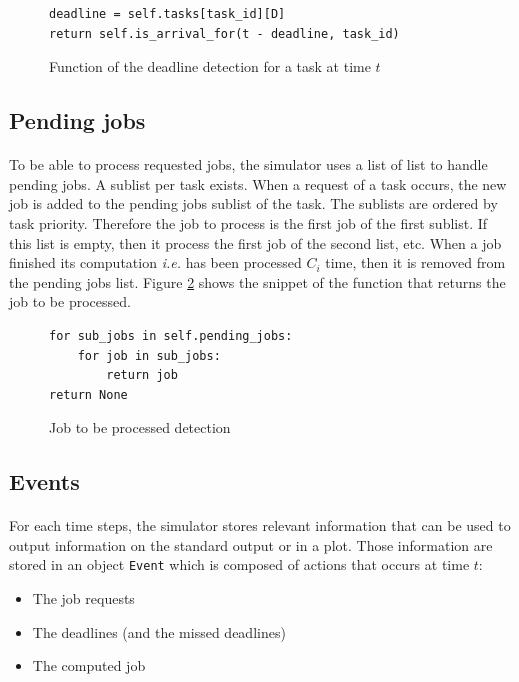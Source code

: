 \documentclass[letterpaper]{article}
\begin{document}
\begin{figure}[H]
    \begin{lstlisting}
deadline = self.tasks[task_id][D]
return self.is_arrival_for(t - deadline, task_id)
    \end{lstlisting}

    \caption{Function of the deadline detection for a task at time $t$}
    \label{fig:deadline_for}
\end{figure}


\subsection{Pending jobs}

\paragraph{} To be able to process requested jobs, the simulator uses a list
of list to handle pending jobs. A sublist per task exists. When a request
of a task occurs, the new job is added to the pending jobs sublist of the
task.
The sublists are ordered by task priority. Therefore the job to process
is the first job of the first sublist. If this list is empty, then
it process the first job of the second list, etc. When a job finished its
computation \textit{i.e.} has been processed $C_i$ time, then it is removed
from the pending jobs list. Figure \ref{fig:pending_jobs} shows the snippet
of the function that returns the job to be processed.

\begin{figure}[H]
    \begin{lstlisting}
for sub_jobs in self.pending_jobs:
    for job in sub_jobs:
        return job
return None
    \end{lstlisting}
    \caption{Job to be processed detection}
    \label{fig:pending_jobs}
\end{figure}

\subsection{Events}

\label{sec:events}

\paragraph{}

For each time steps, the simulator stores relevant information that can
be used to output information on the standard output or in a plot.
Those information are stored in an object \texttt{Event}
which is composed of actions that occurs at time $t$:
\begin{itemize}
  \item The job requests
  \item The deadlines (and the missed deadlines)
  \item The computed job
\end{itemize}
\end{document}
